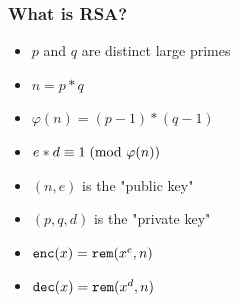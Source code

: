 \documentclass{beamer}
\begin{document}
\begin{frame}[fragile]
\frametitle{What is RSA?}
\begin{itemize}
\item $p$ and $q$ are distinct large primes
\item $n = p * q$
\item $\varphi(n) = (p-1)*(q-1)$
\item $e * d \equiv 1\hspace{1mm}(\text{mod } \varphi(n))$
\item $(n, e)$ is the "public key"
\item $(p, q, d)$ is the "private key"
\item $\verb|enc|(x) = \verb|rem|(x^e, n)$
\item $\verb|dec|(x) = \verb|rem|(x^d, n)$
\end{itemize}
\end{frame}
\end{document}
